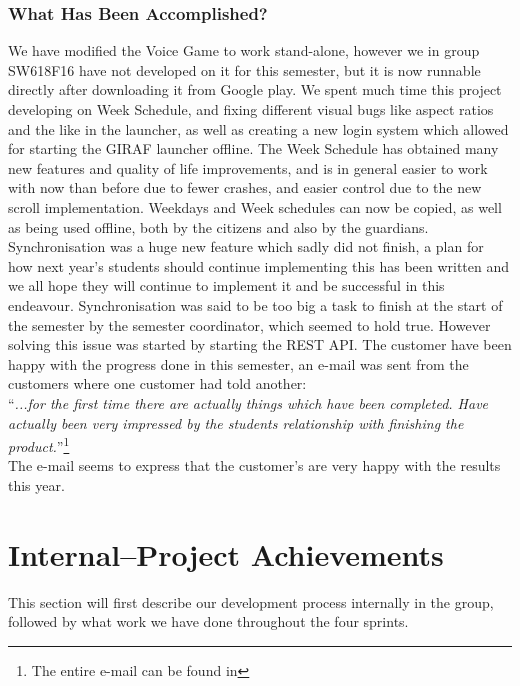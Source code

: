 \subsubsection*{What Has Been Accomplished?}
We have modified the Voice Game to work stand-alone, however we in group SW618F16 have not developed on it for this semester, but it is now runnable directly after downloading it from Google play.
We spent much time this project developing on Week Schedule, and fixing different visual bugs like aspect ratios and the like in the launcher, as well as creating a new login system which allowed for starting the GIRAF launcher offline.
The Week Schedule has obtained many new features and quality of life improvements, and is in general easier to work with now than before due to fewer crashes, and easier control due to the new scroll implementation.
Weekdays and Week schedules can now be copied, as well as being used offline, both by the citizens and also by the guardians.
Synchronisation was a huge new feature which sadly did not finish, a plan for how next year's students should continue implementing this has been written and we all hope they will continue to implement it and be successful in this endeavour.
Synchronisation was said to be too big a task to finish at the start of the semester by the semester coordinator, which seemed to hold true.
However solving this issue was started by starting the REST API.
The customer have been happy with the progress done in this semester, an e-mail was sent from the customers where one customer had told another:\\
\enquote{\textit{...for the first time there are actually things which have been completed. Have actually been very impressed by the students relationship with finishing the product.}}\footnote{The entire e-mail can be found in }
\\
The e-mail seems to express that the customer's are very happy with the results this year.

\section{Internal--Project Achievements}
This section will first describe our development process internally in the group, followed by what work we have done throughout the four sprints.

